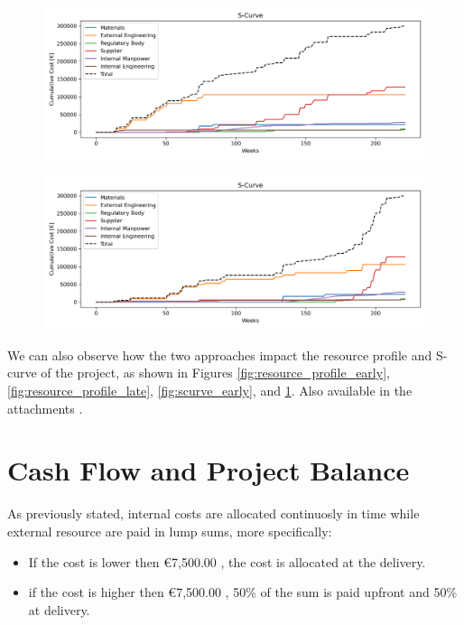 \begin{figure}[p]
    \centering
            \begin{minipage}{\textwidth}
        \centering
        \includegraphics[width=\textwidth]{../s_curve_E.png}
        \label{fig:scurve_early}
    \end{minipage}\hfill
    \begin{minipage}{\textwidth}
        \centering
        \includegraphics[width=\textwidth]{../s_curve_L.png}
        \label{fig:scurve_late}
    \end{minipage}
\end{figure}

We can also observe how the two approaches impact the resource profile and S-curve of the project, as shown in Figures \ref{fig:resource_profile_early}, \ref{fig:resource_profile_late}, \ref{fig:scurve_early}, and \ref{fig:scurve_late}. Also available in the attachments \cite{ResourceProfile1, ResourceProfile2, SCurve1, SCurve2}.

\section{Cash Flow and Project Balance}
As previously stated, internal costs are allocated continuosly in time while external resource are paid in lump sums, more specifically:
\begin{itemize}
    \item If the cost is lower then €7,500.00 , the cost is allocated at the delivery.
    \item if the cost is higher then €7,500.00 , 50\% of the sum is paid upfront and 50\% at delivery.
\end{itemize}

